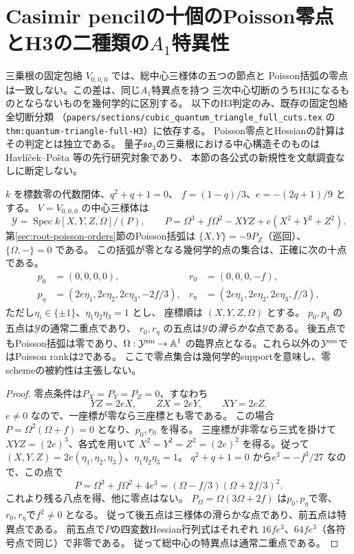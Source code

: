 \section{Casimir pencilの十個のPoisson零点とH3の二種類の\texorpdfstring{$A_1$}{A1}特異性}
\label{sec:casimir-poisson-leaves}
三乗根の固定包絡 $V_{0,0,0}$ では、総中心三様体の五つの節点と
Poisson括弧の零点は一致しない。この差は、同じ$A_1$特異点を持つ
三次中心切断のうちH3になるものとならないものを幾何学的に区別する。
以下のH3判定のみ、既存の固定包絡全切断分類
（\texttt{papers/sections/cubic\_quantum\_triangle\_full\_cuts.tex} の
\texttt{thm:quantum-triangle-full-H3}）に依存する。
Poisson零点とHessianの計算はその判定とは独立である。
量子$\mathfrak{so}_3$の三乗根における中心構造そのものは
Havl\'{i}\v{c}ek--Po\v{s}ta \cite{HavlicekPosta} 等の先行研究対象であり、
本節の各公式の新規性を文献調査なしに断定しない。

\begin{theorem}[十個のPoisson零点と二つの五点集合]
\label{thm:ten-poisson-points}
$k$ を標数零の代数閉体、$q^2+q+1=0$、
$f=(1-q)/3$、$e=-(2q+1)/9$ とする。
$V=V_{0,0,0}$ の中心三様体は
\[
 \mathcal Y=\operatorname{Spec}
 k[X,Y,Z,\Omega]/(P),\qquad
 P=\Omega^3+f\Omega^2-XYZ+e(X^2+Y^2+Z^2).
\]
第\ref{sec:root-poisson-orders}節のPoisson括弧は
$\{X,Y\}=-9P_Z$（巡回）、$\{\Omega,-\}=0$ である。
この括弧が零となる幾何学的点の集合は、正確に次の十点である。
\begin{align*}
 p_0&=(0,0,0,0),&
 r_0&=(0,0,0,-f),\\
 p_\eta&=(2e\eta_1,2e\eta_2,2e\eta_3,-2f/3),&
 r_\eta&=(2e\eta_1,2e\eta_2,2e\eta_3,f/3),
\end{align*}
ただし$\eta_i\in\{\pm1\}$、$\eta_1\eta_2\eta_3=1$ とし、
座標順は $(X,Y,Z,\Omega)$ とする。
$p_0,p_\eta$ の五点は$\mathcal Y$の通常二重点であり、
$r_0,r_\eta$ の五点は$\mathcal Y$の\emph{滑らかな}点である。
後五点でもPoisson括弧は零であり、$\Omega:\mathcal Y^{\rm sm}\to\AA^1$
の臨界点となる。これら以外の$\mathcal Y^{\rm sm}$ではPoisson rankは2である。
ここで零点集合は幾何学的supportを意味し、零schemeの被約性は主張しない。
\end{theorem}
\begin{proof}
零点条件は$P_X=P_Y=P_Z=0$、すなわち
\[
 YZ=2eX,\qquad ZX=2eY,\qquad XY=2eZ.
\]
$e\ne0$ なので、一座標が零なら三座標とも零である。
この場合$P=\Omega^2(\Omega+f)=0$ となり、$p_0,r_0$ を得る。
三座標が非零なら三式を掛けて$XYZ=(2e)^3$、各式を用いて
$X^2=Y^2=Z^2=(2e)^2$ を得る。従って
$(X,Y,Z)=2e(\eta_1,\eta_2,\eta_3)$、$\eta_1\eta_2\eta_3=1$。
$q^2+q+1=0$ から$e^3=-f^3/27$ なので、この点で
\[
 P=\Omega^3+f\Omega^2+4e^3
   =(\Omega-f/3)(\Omega+2f/3)^2.
\]
これより残る八点を得、他に零点はない。
$P_\Omega=\Omega(3\Omega+2f)$ は$p_0,p_\eta$で零、
$r_0,r_\eta$で$f^2\ne0$ となる。
従って後五点は三様体の滑らかな点であり、前五点は特異点である。
前五点で$P$の四変数Hessian行列式はそれぞれ
$16fe^3$、$64fe^3$（各符号点で同じ）で非零である。
従って総中心の特異点は通常二重点である。
\end{proof}

